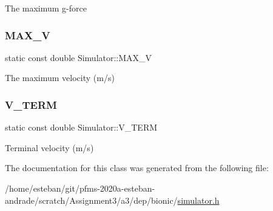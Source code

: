 The maximum g-\/force \mbox{\label{classSimulator_aa4e6371b6605ae050de558167256a9d0}} 
\subsubsection{\texorpdfstring{M\+A\+X\+\_\+V}{MAX\_V}}
{\footnotesize\ttfamily static const double Simulator\+::\+M\+A\+X\+\_\+V\hspace{0.3cm}{\ttfamily [static]}}

The maximum velocity (m/s) \mbox{\label{classSimulator_a8250a5fd76149109333aed2c91fa846e}} 
\subsubsection{\texorpdfstring{V\+\_\+\+T\+E\+RM}{V\_TERM}}
{\footnotesize\ttfamily static const double Simulator\+::\+V\+\_\+\+T\+E\+RM\hspace{0.3cm}{\ttfamily [static]}}

Terminal velocity (m/s) 

The documentation for this class was generated from the following file\+:\begin{DoxyCompactItemize}
\item 
/home/esteban/git/pfms-\/2020a-\/esteban-\/andrade/scratch/\+Assignment3/a3/dep/bionic/\hyperlink{bionic_2simulator_8h}{simulator.\+h}\end{DoxyCompactItemize}
